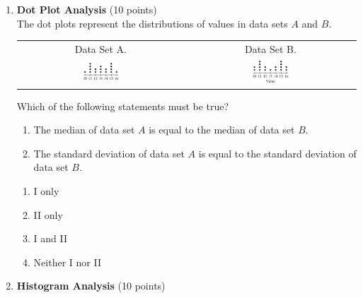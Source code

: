 \begin{enumerate}
  \item \textbf{Dot Plot Analysis} (10 points)\\
  The dot plots represent the distributions of values in data sets $A$ and $B$.
  \begin{center}
  \begin{tabular}{cc}
  Data Set A. & Data Set B. \\
  \includegraphics[width=0.23\textwidth]{images/2025_06_15_04f7426dc644de311e92g-15(1)} &
  \includegraphics[width=0.23\textwidth]{images/2025_06_15_04f7426dc644de311e92g-15} \\
  \end{tabular}
  \end{center}
  Which of the following statements must be true?
  \begin{enumerate}[label=(\Roman*)]
    \item The median of data set $A$ is equal to the median of data set $B$.
    \item The standard deviation of data set $A$ is equal to the standard deviation of data set $B$.
  \end{enumerate}
  \begin{enumerate}[label=(\Alph*)]
    \item I only
    \item II only
    \item I and II
    \item Neither I nor II
  \end{enumerate}
  \begin{subanswer}
  \end{subanswer}

  \newpage

  \item \textbf{Histogram Analysis} (10 points)\\


\end{enumerate}
